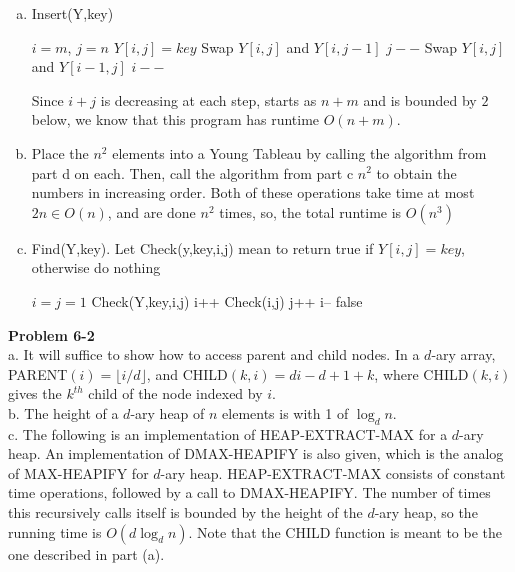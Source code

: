 \documentclass{article}
\begin{document}
\begin{enumerate}[a.]
\item
Insert(Y,key)
\begin{algorithm}
\begin{algorithmic}[1]
\State$i=m$, $j=n$
\State $Y[i,j] = key$
\State Swap $Y[i,j]$ and $Y[i,j-1]$
\State $j--$
\Else
\State Swap $Y[i,j]$ and $Y[i-1,j]$
\State $i--$
\EndIf
\EndWhile
\end{algorithmic}
\end{algorithm}
Since $i+j$ is decreasing at each step, starts as $n+m$ and is bounded by $2$ below, we know that this program has runtime $O(n+m)$.
\item
Place the $n^2$ elements into a Young Tableau by calling the algorithm from part d on each. Then, call the algorithm from part c $n^2$ to obtain the numbers in increasing order. Both of these operations take time at most $2n\in O(n)$, and are done $n^2$ times, so, the total runtime is $O(n^3)$
\item
Find(Y,key). Let Check(y,key,i,j) mean to return true if $Y[i,j]=key$, otherwise do nothing
\begin{algorithm}
\begin{algorithmic}
\State$ i =j= 1$
\State Check(Y,key,i,j)
\State i++
\EndWhile
{}
\State Check(i,j)
\State j++
\Else
\State i--
\EndIf
\EndWhile
\State \Return false
\end{algorithmic}
\end{algorithm}
\end{enumerate}

\noindent\textbf{Problem 6-2}\\

a. It will suffice to show how to access parent and child nodes.  In a $d$-ary array, PARENT$(i) = \lfloor i/d \rfloor$, and CHILD$(k,i) = di - d + 1 + k$, where CHILD$(k,i)$ gives the $k^{th}$ child of the node indexed by $i$. \\

b. The height of a $d$-ary heap of $n$ elements is with 1 of $\log_d n$. \\

c.  The following is an implementation of HEAP-EXTRACT-MAX for a $d$-ary heap.  An implementation of DMAX-HEAPIFY is also given, which is the analog of MAX-HEAPIFY for $d$-ary heap.  HEAP-EXTRACT-MAX consists of constant time operations, followed by a call to DMAX-HEAPIFY.  The number of times this recursively calls itself is bounded by the height of the $d$-ary heap, so the running time is $O(d\log_d n)$.  Note that the CHILD function is meant to be the one described in part (a).\\
\end{document}
